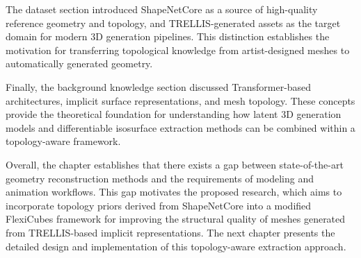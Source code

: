 \documentclass[../main.tex]{subfiles}
\begin{document}
The dataset section introduced ShapeNetCore as a source of high-quality reference geometry and topology, and TRELLIS-generated assets as the target domain for modern 3D generation pipelines. This distinction establishes the motivation for transferring topological knowledge from artist-designed meshes to automatically generated geometry.

Finally, the background knowledge section discussed Transformer-based architectures, implicit surface representations, and mesh topology. These concepts provide the theoretical foundation for understanding how latent 3D generation models and differentiable isosurface extraction methods can be combined within a topology-aware framework.

Overall, the chapter establishes that there exists a gap between state-of-the-art geometry reconstruction methods and the requirements of modeling and animation workflows. This gap motivates the proposed research, which aims to incorporate topology priors derived from ShapeNetCore into a modified FlexiCubes framework for improving the structural quality of meshes generated from TRELLIS-based implicit representations. The next chapter presents the detailed design and implementation of this topology-aware extraction approach.
\end{document}
